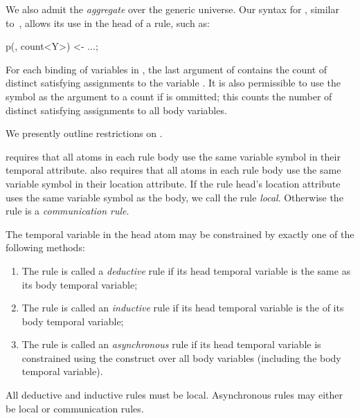 We also admit the  {\em aggregate} over the generic universe.  Our syntax for , similar to~\cite{datalog-agg}, allows its use in the head of a rule, such as:

\begin{Dedalus}
p(, count<Y>) <- ...;
\end{Dedalus}

For each binding of variables in , the last argument of  contains the count of distinct satisfying assignments to the variable .  It is also permissible to use the symbol \dedalus{*} as the argument to a count if  is ommitted; this counts the number of distinct satisfying assignments to all body variables.

We presently outline restrictions on \lang.

\vspace{1em}
\lang requires that all atoms in each rule body use the same variable symbol in their temporal attribute.  \lang also requires that all atoms in each rule body use the same variable symbol in their location attribute.  If the rule head's location attribute uses the same variable symbol as the body, we call the rule {\em local}.  Otherwise the rule is a {\em communication rule}.

The temporal variable in the head atom may be constrained by exactly one of the following methods:

\begin{enumerate}
\item The rule is called a {\em deductive} rule if its head temporal variable is the same as its body temporal variable;
\item The rule is called an {\em inductive} rule if its head temporal variable is the  of its body temporal variable;
\item The rule is called an {\em asynchronous} rule if its head temporal variable is constrained using the  construct over all body variables (including the body temporal variable).
\end{enumerate}

All deductive and inductive rules must be local.  Asynchronous rules may either be local or communication rules.

